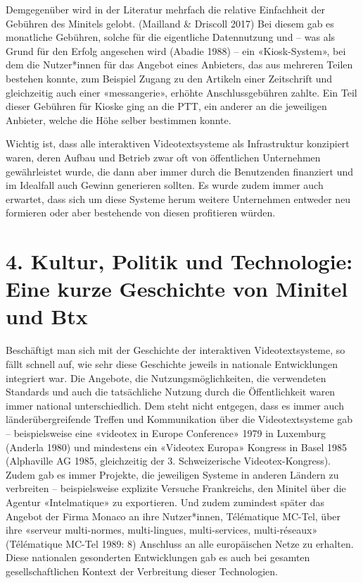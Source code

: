 \documentclass[a4paper,
fontsize=11pt,
oneside,
numbers=noperiodatend,
parskip=half-,
bibliography=totoc,
final
]{scrartcl}
\begin{document}
Demgegenüber wird in der Literatur mehrfach die relative Einfachheit der
Gebühren des Minitels gelobt. (Mailland \& Driscoll 2017) Bei diesem gab
es monatliche Gebühren, solche für die eigentliche Datennutzung und --
was als Grund für den Erfolg angesehen wird (Abadie 1988) -- ein
«Kiosk-System», bei dem die Nutzer*innen für das Angebot eines
Anbieters, das aus mehreren Teilen bestehen konnte, zum Beispiel Zugang
zu den Artikeln einer Zeitschrift und gleichzeitig auch einer
«messangerie», erhöhte Anschlussgebühren zahlte. Ein Teil dieser
Gebühren für Kioske ging an die PTT, ein anderer an die jeweiligen
Anbieter, welche die Höhe selber bestimmen konnte.

Wichtig ist, dass alle interaktiven Videotextsysteme als Infrastruktur
konzipiert waren, deren Aufbau und Betrieb zwar oft von öffentlichen
Unternehmen gewährleistet wurde, die dann aber immer durch die
Benutzenden finanziert und im Idealfall auch Gewinn generieren sollten.
Es wurde zudem immer auch erwartet, dass sich um diese Systeme herum
weitere Unternehmen entweder neu formieren oder aber bestehende von
diesen profitieren würden.

\hypertarget{kultur-politik-und-technologie-eine-kurze-geschichte-von-minitel-und-btx}{%
\section{4. Kultur, Politik und Technologie: Eine kurze Geschichte
von Minitel und
Btx}\label{kultur-politik-und-technologie-eine-kurze-geschichte-von-minitel-und-btx}}

Beschäftigt man sich mit der Geschichte der interaktiven
Videotextsysteme, so fällt schnell auf, wie sehr diese Geschichte
jeweils in nationale Entwicklungen integriert war. Die Angebote, die
Nutzungsmöglichkeiten, die verwendeten Standards und auch die
tatsächliche Nutzung durch die Öffentlichkeit waren immer national
unterschiedlich. Dem steht nicht entgegen, dass es immer auch
länderübergreifende Treffen und Kommunikation über die Videotextsysteme
gab -- beispielsweise eine «videotex in Europe Conference» 1979 in
Luxemburg (Anderla 1980) und mindestens ein «Videotex Europa» Kongress
in Basel 1985 (Alphaville AG 1985, gleichzeitig der 3. Schweizerische
Videotex-Kongress). Zudem gab es immer Projekte, die jeweiligen Systeme
in anderen Ländern zu verbreiten -- beispielsweise explizite Versuche
Frankreichs, den Minitel über die Agentur «Intelmatique» zu exportieren.
Und zudem zumindest später das Angebot der Firma Monaco an ihre
Nutzer*innen, Télématique MC-Tel, über ihre «serveur multi-normes,
multi-lingues, multi-services, multi-réseaux» (Télématique MC-Tel 1989:
8) Anschluss an alle europäischen Netze zu erhalten. Diese nationalen
gesonderten Entwicklungen gab es auch bei gesamten gesellschaftlichen
Kontext der Verbreitung dieser Technologien.
\end{document}
